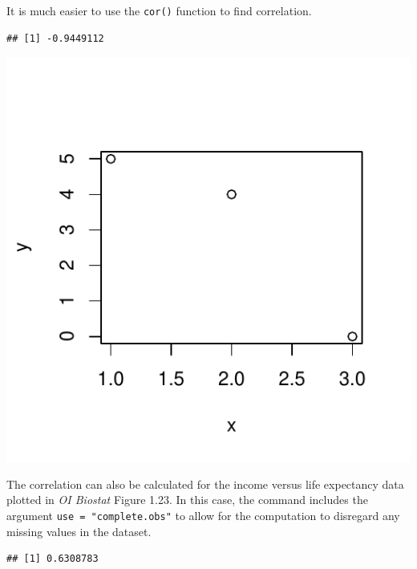 It is much easier to use the \texttt{cor()} function to find correlation. 

\begin{knitrout}
\color{fgcolor}\begin{kframe}
\begin{alltt}
\end{alltt}
\begin{verbatim}
## [1] -0.9449112
\end{verbatim}
\begin{alltt}
\end{alltt}
\end{kframe}
\includegraphics[width=\maxwidth]{figure/unnamed-chunk-26-1} 

\end{knitrout}

The correlation can also be calculated for the income versus life expectancy data plotted in \textit{OI Biostat} Figure 1.23. In this case, the command includes the argument \texttt{use = "complete.obs"} to allow for the computation to disregard any missing values in the dataset.

\begin{knitrout}
\color{fgcolor}\begin{kframe}
\begin{alltt}
\hlopt{$}\hlopt{$}
     \hlstd{=} \hlstd{)}
\end{alltt}
\begin{verbatim}
## [1] 0.6308783
\end{verbatim}
\end{kframe}
\end{knitrout}

